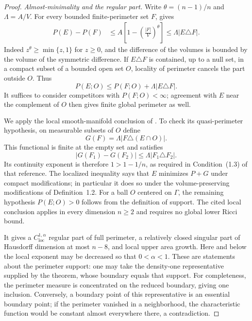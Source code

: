 \begin{proof}
\emph{Almost-minimality and the regular part.}
Write $\theta=(n-1)/n$ and $\Lambda=A/V$. For every bounded
finite-perimeter set $F$,  gives
\begin{equation}
\label{eq:equality-almost-minimality}
 \begin{split}
 P(E)-P(F)
 &\le A\left[1-\left(\frac{|F|}{V}\right)^\theta\right]
 \le\Lambda|E\triangle F|.
 \end{split}
\end{equation}
Indeed $z^\theta\ge\min\{z,1\}$ for $z\ge0$, and the difference
of the volumes is bounded by the volume of the symmetric difference.
If $E\triangle F$ is contained, up to a null set, in a compact subset
of a bounded open set $O$, locality of perimeter cancels the part
outside $O$. Thus
\[
 P(E;O)\le P(F;O)+\Lambda|E\triangle F|.
\]
It suffices to consider competitors with $P(F;O)<\infty$; agreement
with $E$ near the complement of $O$ then gives finite global
perimeter as well.

We apply the local smooth-manifold conclusion of
\cite[Corollary~1.6]{AntonelliPasqualettoPozzetta2022}. To check its
quasi-perimeter hypothesis, on measurable subsets of $O$ define
\[
 G(F)=\Lambda|F\triangle(E\cap O)|.
\]
This functional is finite at the empty set and satisfies
\[
 |G(F_1)-G(F_2)|\le\Lambda|F_1\triangle F_2|.
\]
Its continuity exponent is therefore $1>1-1/n$, as required in
Condition~(1.3) of that reference. The localized inequality says that
$E$ minimizes $P+G$ under compact modifications; in particular it
does so under the volume-preserving modifications of Definition~1.2.
For a ball $O$ centered on $\Gamma$, the remaining hypothesis
$P(E;O)>0$ follows from the definition of support. The cited local
conclusion applies in every dimension $n\ge2$ and requires no global
lower Ricci bound.

It gives a $C^{1,\alpha}_{\mathrm{loc}}$ regular part of full
perimeter, a relatively closed singular part of Hausdorff dimension
at most $n-8$, and local upper area growth. Here and below the local
exponent may be decreased so that $0<\alpha<1$. These are statements
about the perimeter support: one may take the density-one
representative supplied by the theorem, whose boundary equals that
support. For completeness, the perimeter measure is concentrated on
the reduced boundary, giving one inclusion. Conversely, a boundary
point of this representative is an essential boundary point; if the
perimeter vanished in a neighborhood, the characteristic function
would be constant almost everywhere there, a contradiction.


\end{proof}
